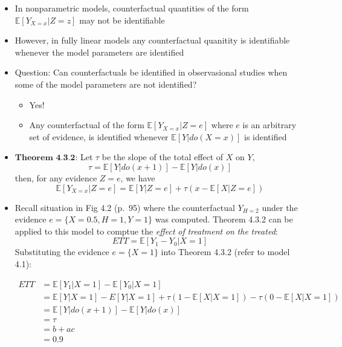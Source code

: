 \documentclass[]{article}
\providecommand{\tightlist}{%
  \setlength{\itemsep}{0pt}\setlength{\parskip}{0pt}}
\begin{document}
\begin{itemize}
\item
  In nonparametric models, counterfactual quantities of the form
  \(\mathbb{E}[Y_{X = x} | Z = z]\) may not be identifiable
\item
  However, in fully linear models any counterfactual quanitity is
  identifiable whenever the model parameters are identified
\item
  Question: Can counterfactuals be identified in observasional studies
  when some of the model parameters are not identified?

  \begin{itemize}
  \tightlist
  \item
    Yes!
  \item
    Any counterfactual of the form \(\mathbb{E}[Y_{X = x} | Z = e]\)
    where \(e\) is an arbitrary set of evidence, is identified whenever
    \(\mathbb{E}[Y|do(X = x)]\) is identified
  \end{itemize}
\item
  \(\textbf{Theorem 4.3.2}\): Let \(\tau\) be the slope of the total
  effect of \(X\) on \(Y\),
  \[\tau = \mathbb{E}[Y|do(x+1)] - \mathbb{E}[Y|do(x)]\] then, for any
  evidence \(Z = e\), we have
  \[\mathbb{E}[Y_{X = x}|Z = e] = \mathbb{E}[Y|Z = e] + \tau(x - \mathbb{E}[X|Z = e])\]
\item
  Recall situation in Fig 4.2 (p.~95) where the counterfactual
  \(Y_{H=2}\) under the evidence \(e=\{X = 0.5, H = 1, Y = 1\}\) was
  computed. Theorem 4.3.2 can be applied to this model to comptue the
  \emph{effect} \emph{of} \emph{treatment} \emph{on} \emph{the}
  \emph{treated}: \[ETT = \mathbb{E}[Y_1 - Y_0 | X = 1]\] Substituting
  the evidence \(e = \{X = 1\}\) into Theorem 4.3.2 (refer to model
  4.1):

  \begin{equation*}
    \begin{split}
  ETT &= \mathbb{E}[Y_1 | X = 1] - \mathbb{E}[Y_0|X = 1] \\
  &= \mathbb{E}[Y|X = 1] - E[Y|X = 1] + \tau(1 - \mathbb{E}[X|X=1]) - \tau(0 - \mathbb{E}[X|X=1]) \\
  &= \mathbb{E}[Y|do(x+1)] - \mathbb{E}[Y|do(x)] \\
  &= \tau \\
  &= b + ac \\
  &= 0.9
    \end{split}
  \end{equation*}
\end{itemize}
\end{document}
